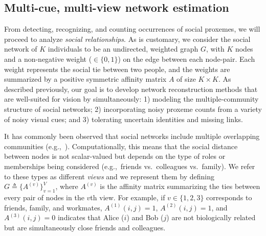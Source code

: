 
\subsection{Multi-cue, multi-view network estimation}
\label{sec:vis2net}
\vspace{-5pt}

From detecting, recognizing, and counting occurrences of social proxemes, we will proceed to analyze \emph{social relationships}. As is customary, we consider the social network of $K$ individuals to be an undirected, weighted graph $G$, with $K$ nodes and a non-negative weight ($\in \{0,1\}$) on the edge between each node-pair. Each weight represents the social tie between two people, and the weights are summarized by a positive symmetric affinity matrix $A$ of size $K\times K$. As described previously, our goal is to develop network reconstruction methods that are well-suited for vision by simultaneously: 1) modeling the multiple-community structure of social networks; 2) incorporating noisy proxeme counts from a variety of noisy visual cues; and 3) tolerating uncertain identities and missing links.

It has commonly been observed that social networks include multiple overlapping communities (e.g.,~\cite{AiroldiBFX08,Kim12}). Computationally, this means that the social distance between nodes is not scalar-valued but depends on the type of roles or memberships being considered (e.g.,~friends vs.~colleagues vs.~family). We refer to these types as different \emph{views} and we represent them by defining $G\triangleq\{A^{(v)}\}_{v=1}^{V}$, where $A^{(v)}$ is the affinity matrix summarizing the ties between every pair of nodes in the $v$th view. For example, if $v\in\{1,2,3\}$ corresponds to friends, family, and workmates, $A^{(1)}(i,j)=1$, $A^{(2)}(i,j)=1$, and $A^{(3)}(i,j)=0$ indicates that Alice ($i$) and Bob ($j$) are not biologically related but are simultaneously close friends and colleagues.

